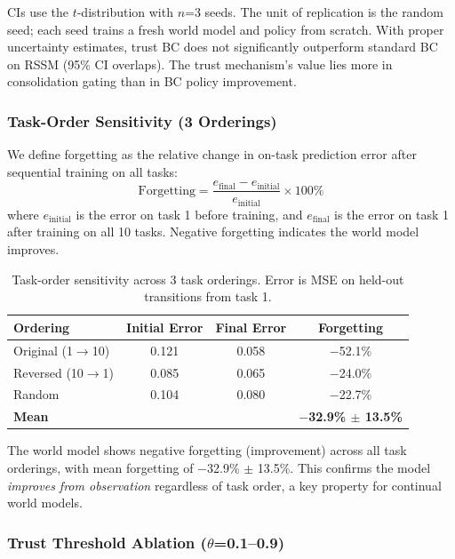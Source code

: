\documentclass{article}
\begin{document}
CIs use the $t$-distribution with $n$=3 seeds. The unit of replication is the random seed; each seed trains a fresh world model and policy from scratch. With proper uncertainty estimates, trust BC does not significantly outperform standard BC on RSSM (95\% CI overlaps). The trust mechanism's value lies more in consolidation gating than in BC policy improvement.

\subsubsection{Task-Order Sensitivity (3 Orderings)}

We define forgetting as the relative change in on-task prediction error after sequential training on all tasks:
\[
\text{Forgetting} = \frac{e_{\text{final}} - e_{\text{initial}}}{e_{\text{initial}}} \times 100\%
\]
where $e_{\text{initial}}$ is the error on task 1 before training, and $e_{\text{final}}$ is the error on task 1 after training on all 10 tasks. Negative forgetting indicates the world model improves.

\begin{table}[h]
\centering
\caption{Task-order sensitivity across 3 task orderings. Error is MSE on held-out transitions from task 1.}
\label{tab:task_order}
\begin{tabular}{lccc}
\toprule
Ordering & Initial Error & Final Error & Forgetting \\
\midrule
Original (1$\to$10) & 0.121 & 0.058 & $-$52.1\% \\
Reversed (10$\to$1) & 0.085 & 0.065 & $-$24.0\% \\
Random & 0.104 & 0.080 & $-$22.7\% \\
\midrule
\textbf{Mean} & & & \textbf{$-$32.9\% $\pm$ 13.5\%} \\
\bottomrule
\end{tabular}
\end{table}

The world model shows negative forgetting (improvement) across all task orderings, with mean forgetting of $-$32.9\% $\pm$ 13.5\%. This confirms the model \emph{improves from observation} regardless of task order, a key property for continual world models.

\subsubsection{Trust Threshold Ablation ($\theta$=0.1--0.9)}
\end{document}
